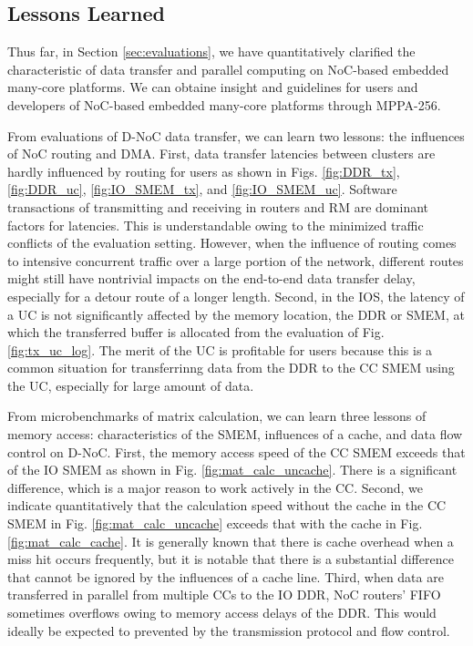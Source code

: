   
  \subsection{Lessons Learned}
  \label{sec:lessons}
  Thus far, in Section \ref{sec:evaluations}, we have quantitatively clarified the characteristic of data transfer and parallel computing on NoC-based embedded many-core platforms.
  We can obtaine insight and guidelines for users and developers of NoC-based embedded many-core platforms through MPPA-256.
  
  From evaluations of D-NoC data transfer, we can learn two lessons: the influences of NoC routing and DMA.
  First, data transfer latencies between clusters are hardly influenced by routing for users as shown in Figs. \ref{fig:DDR_tx}, \ref{fig:DDR_uc}, \ref{fig:IO_SMEM_tx}, and \ref{fig:IO_SMEM_uc}.
  Software transactions of transmitting and receiving in routers and RM are dominant factors for latencies.
  This is understandable owing to the minimized traffic conflicts of the evaluation setting.
  However, when the influence of routing comes to intensive concurrent traffic over a large portion of the network, different routes might still have nontrivial impacts on the end-to-end data transfer delay, especially for a detour route of a longer length.
  Second, in the IOS, the latency of a UC is not significantly affected by the memory location, the DDR or SMEM, at which the transferred buffer is allocated from the evaluation of Fig. \ref{fig:tx_uc_log}.
  The merit of the UC is profitable for users because this is a common situation for transferrinng data from the DDR to the CC SMEM using the UC, especially for large amount of data.
  
  From microbenchmarks of matrix calculation, we can learn three lessons of memory access: characteristics of the SMEM, influences of a cache, and data flow control on D-NoC.
  First, the memory access speed of the CC SMEM exceeds that of the IO SMEM as shown in Fig. \ref{fig:mat_calc_uncache}.
  There is a significant difference, which is a major reason to work actively in the CC.
  Second, we indicate quantitatively that the calculation speed without the cache in the CC SMEM in Fig. \ref{fig:mat_calc_uncache} exceeds that with the cache in Fig. \ref{fig:mat_calc_cache}.
  It is generally known that there is cache overhead when a miss hit occurs frequently, but it is notable that there is a substantial difference that cannot be ignored by the influences of a cache line.
  Third, when data are transferred in parallel from multiple CCs to the IO DDR, NoC routers' FIFO sometimes overflows owing to memory access delays of the DDR.
  This would ideally be expected to prevented by the transmission protocol and flow control.
  
